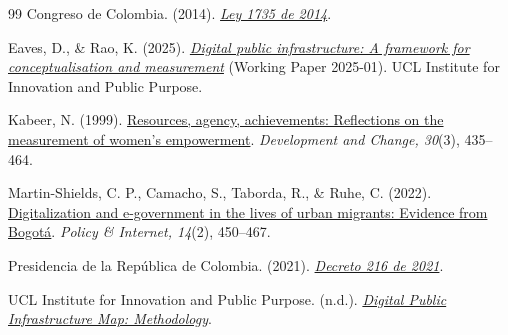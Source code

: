 \begin{thebibliography}{99}
Congreso de Colombia. (2014). \href{https://normograma.dian.gov.co/dian/compilacion/docs/ley_1735_2014.htm}{\emph{Ley 1735 de 2014}}.

Eaves, D., \& Rao, K. (2025). \href{https://discovery.ucl.ac.uk/id/eprint/10210968/}{\emph{Digital public infrastructure: A framework for conceptualisation and measurement}} (Working Paper 2025-01). UCL Institute for Innovation and Public Purpose.

Kabeer, N. (1999). \href{https://doi.org/10.1111/1467-7660.00125}{Resources, agency, achievements: Reflections on the measurement of women's empowerment}. \emph{Development and Change, 30}(3), 435--464.

Martin-Shields, C. P., Camacho, S., Taborda, R., \& Ruhe, C. (2022). \href{https://doi.org/10.1002/poi3.280}{Digitalization and e-government in the lives of urban migrants: Evidence from Bogotá}. \emph{Policy \& Internet, 14}(2), 450--467.

Presidencia de la República de Colombia. (2021). \href{https://www.funcionpublica.gov.co/eva/gestornormativo/norma.php?i=159606}{\emph{Decreto 216 de 2021}}.

UCL Institute for Innovation and Public Purpose. (n.d.). \href{https://dpimap.org/methodology/}{\emph{Digital Public Infrastructure Map: Methodology}}.
\end{thebibliography}
